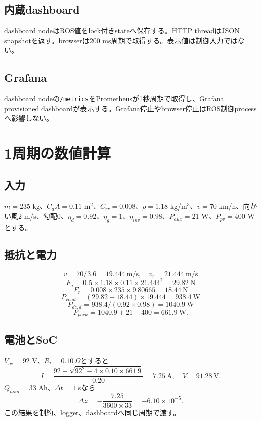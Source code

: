 \documentclass[a4paper,10pt,oneside]{book}
\begin{document}
\section{内蔵dashboard}
dashboard nodeはROS値をlock付きstateへ保存する。HTTP threadはJSON snapshotを返す。browserは200 ms周期で取得する。表示値は制御入力ではない。

\section{Grafana}
dashboard nodeの\texttt{/metrics}をPrometheusが1秒周期で取得し、Grafana provisioned dashboardが表示する。Grafana停止やbrowser停止はROS制御processへ影響しない。

\chapter{1周期の数値計算}
\section{入力}
$m=235$ kg、$C_dA=0.11$ m$^2$、$C_{rr}=0.008$、$\rho=1.18$ kg/m$^3$、$v=70$ km/h、向かい風2 m/s、勾配0、$\eta_d=0.92$、$\eta_g=1$、$\eta_{inv}=0.98$、$P_{aux}=21$ W、$P_{pv}=400$ Wとする。

\section{抵抗と電力}
\[
v=70/3.6=19.444\ \mathrm{m/s},\quad v_r=21.444\ \mathrm{m/s}
\]
\[
F_a=0.5\times1.18\times0.11\times21.444^2=29.82\ \mathrm{N}
\]
\[
F_r=0.008\times235\times9.80665=18.44\ \mathrm{N}
\]
\[
P_{road}=(29.82+18.44)\times19.444=938.4\ \mathrm{W}
\]
\[
P_{dc,d}=938.4/(0.92\times0.98)=1040.9\ \mathrm{W}
\]
\[
P_{pack}=1040.9+21-400=661.9\ \mathrm{W}.
\]

\section{電池とSoC}
$V_{oc}=92$ V、$R_t=0.10\ \Omega$とすると
\[
I=\frac{92-\sqrt{92^2-4\times0.10\times661.9}}{0.20}=7.25\ \mathrm{A},
\quad V=91.28\ \mathrm{V}.
\]
$Q_{nom}=33$ Ah、$\Delta t=1$ sなら
\[
\Delta z=-\frac{7.25}{3600\times33}=-6.10\times10^{-5}.
\]
この結果を制約、logger、dashboardへ同じ周期で渡す。
\end{document}
